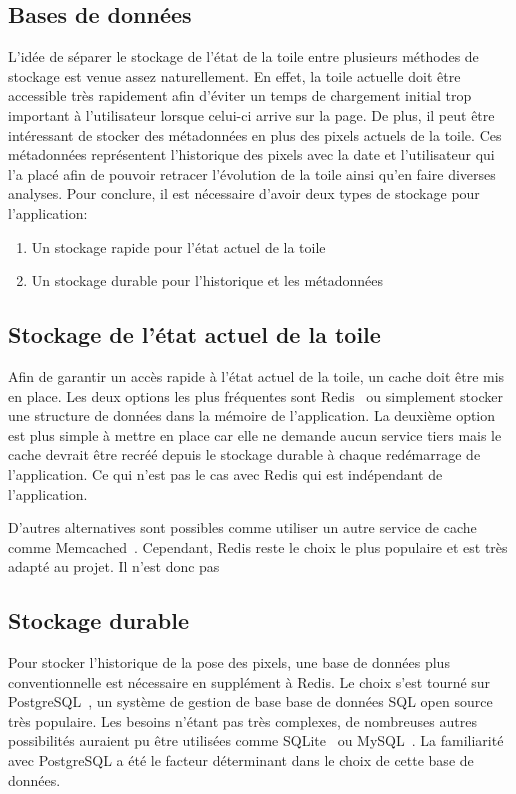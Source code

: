 \subsection{Bases de données}

L'idée de séparer le stockage de l'état de la toile entre plusieurs méthodes de stockage est venue assez naturellement. En effet, la toile actuelle doit être accessible très rapidement afin d'éviter un temps de chargement initial trop important à l'utilisateur lorsque celui-ci arrive sur la page. De plus, il peut être intéressant de stocker des métadonnées en plus des pixels actuels de la toile. Ces métadonnées représentent l'historique des pixels avec la date et l'utilisateur qui l'a placé afin de pouvoir retracer l'évolution de la toile ainsi qu'en faire diverses analyses. Pour conclure, il est nécessaire d'avoir deux types de stockage pour l'application:

\begin{enumerate}
  \item Un stockage rapide pour l'état actuel de la toile
  \item Un stockage durable pour l'historique et les métadonnées
\end{enumerate}

\subsection{Stockage de l'état actuel de la toile}

Afin de garantir un accès rapide à l'état actuel de la toile, un cache doit être mis en place. Les deux options les plus fréquentes sont Redis~\cite{redis} ou simplement stocker une structure de données dans la mémoire de l'application. La deuxième option est plus simple à mettre en place car elle ne demande aucun service tiers mais le cache devrait être recréé depuis le stockage durable à chaque redémarrage de l'application. Ce qui n'est pas le cas avec Redis qui est indépendant de l'application.

D'autres alternatives sont possibles comme utiliser un autre service de cache comme Memcached~\cite{memcached}. Cependant, Redis reste le choix le plus populaire et est très adapté au projet. Il n'est donc pas

\subsection{Stockage durable}

Pour stocker l'historique de la pose des pixels, une base de données plus conventionnelle est nécessaire en supplément à Redis. Le choix s'est tourné sur PostgreSQL~\cite{postgresql}, un système de gestion de base base de données SQL open source très populaire. Les besoins n'étant pas très complexes, de nombreuses autres possibilités auraient pu être utilisées comme SQLite~\cite{sqlite} ou MySQL~\cite{mysql}. La familiarité avec PostgreSQL a été le facteur déterminant dans le choix de cette base de données.
